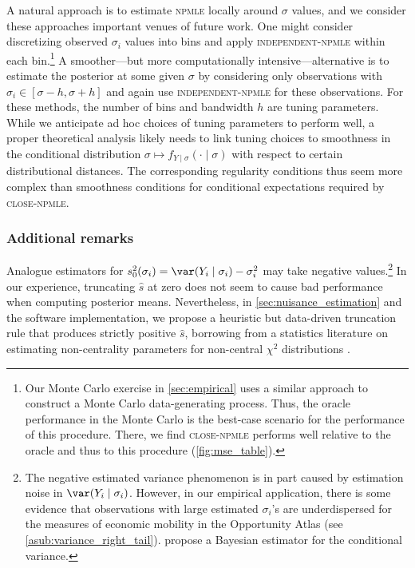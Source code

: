 \documentclass[12pt, reqno]{amsart}
\newcommand{\indepnpmle}{\textsc{independent-npmle}}
\newcommand{\hats}{\hat s}
\newcommand{\close}{\textsc{close}}
\newcommand{\npmle}{\textsc{npmle}}
\newcommand{\closenpmle}{\close-\npmle}
\numberwithin{equation}{section}
\begin{document}
A natural approach is to estimate \npmle{} locally around $\sigma$ values, and we consider
these approaches important venues of future work. One might consider discretizing observed
$\sigma_i$ values into bins and apply
\indepnpmle{} within each bin.\footnote{Our Monte Carlo exercise in \cref{sec:empirical}
uses a similar approach to construct a Monte Carlo data-generating process. Thus, the
oracle performance in the Monte Carlo is the best-case scenario for the performance of
this procedure. There, we find \closenpmle{} performs well relative to the oracle and thus
to this procedure (\cref{fig:mse_table}).} A smoother---but more computationally
intensive---alternative is to estimate the posterior at some given $\sigma$ by considering
only observations with $\sigma_i \in [\sigma-h,
\sigma+h]$ and again use
\indepnpmle{} for these observations. For these methods, the number of bins and bandwidth
$h$ are tuning parameters. While we anticipate ad hoc choices of tuning parameters to
perform well, a proper theoretical analysis likely needs to link tuning choices to
smoothness in the conditional distribution $\sigma \mapsto f_{Y\mid \sigma}(\cdot \mid
\sigma)$ with respect to certain distributional distances. The corresponding regularity
conditions thus seem more complex than smoothness conditions for conditional expectations
required by \closenpmle.





\subsubsection{Additional remarks}
















\begin{rmksq}
\label{rmk:practical}
Analogue estimators for $s_0^2(\sigma_i) =
\var(Y_i \mid \sigma_i) - \sigma_i^2$ may take negative values.\footnote{The negative
estimated variance phenomenon is in part caused by estimation noise in $\var(Y_i \mid
\sigma_i)$. However, in our empirical application, there is some evidence that
observations with large estimated $\sigma_i$'s are underdispersed for the measures of
economic mobility in the Opportunity Atlas (see \cref{asub:variance_right_tail}).
\citet{armstrong2022robust} propose a Bayesian estimator for the conditional variance. }
In our experience, truncating $\hats$ at zero does not seem to cause bad performance when
computing posterior means. Nevertheless, in \cref{sec:nuisance_estimation} and the
software implementation, we propose a heuristic but data-driven truncation rule that
produces strictly positive $\hats$, borrowing from a statistics literature on estimating
non-centrality parameters for non-central $\chi^2$ distributions
\citep{kubokawa1993estimation}.
\end{rmksq}
\end{document}
